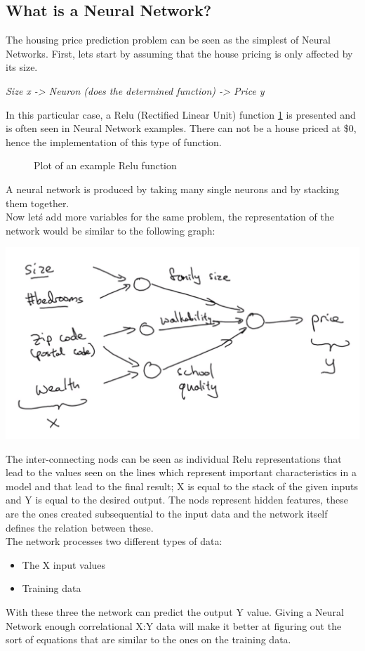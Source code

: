 \documentclass[11pt]{report}
\begin{document}
\subsection*{What is a Neural Network?}
The housing price prediction problem can be seen as the simplest of Neural Networks. First, lets start by assuming that the house pricing is only affected by its size.
\begin{center}
	\textit{Size x -> Neuron (does the determined function) -> Price y}
\end{center}
In this particular case, a Relu (Rectified Linear Unit) function \ref{fig:F1} is presented and is often seen in Neural Network examples. There can not be a house priced at \$0, hence the implementation of this type of function.
\begin{figure}
	\centering
	\caption{Plot of an example Relu function} \label{fig:F1}
\end{figure}
A neural network is produced by taking many single neurons and by stacking them together. \\
Now let\'s add more variables for the same problem, the representation of the network would be similar to the following graph:
\begin{center}
	\includegraphics[width = .50\textwidth]{HPP.png}
\end{center}
The inter-connecting nods can be seen as individual Relu representations that lead to the values seen on the lines which represent important characteristics in a model and that lead to the final result; X is equal to the stack of the given inputs and Y is equal to the desired output. The  nods represent hidden features, these are the ones created subsequential to the input data and the network itself defines the relation between these.\\
The network processes two different types of data:
\begin{itemize}
	\item The X input values
	\item Training data
\end{itemize}
With these three the network can predict the output Y value. Giving a Neural Network enough correlational X:Y data will make it better at figuring out the sort of equations that are similar to the ones on the training data.
\end{document}
